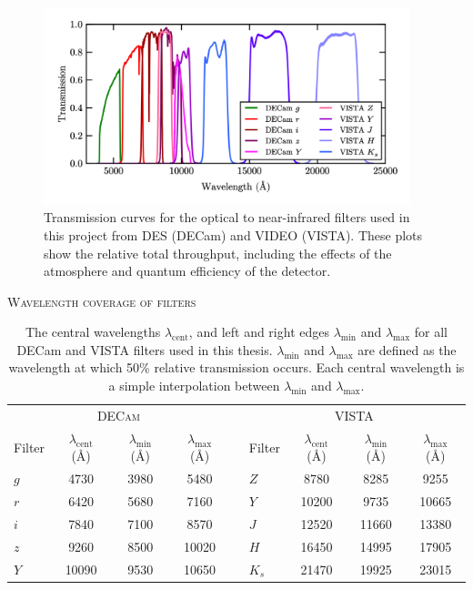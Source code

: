 \begin{figure}[!pht] 
\centering    
\includegraphics[width=0.95\textwidth]{filters.png}
\caption[DES and VIDEO filter transmission curves]{Transmission curves for the optical to near-infrared filters used in this project from DES (DECam) and VIDEO (VISTA). These plots show the relative total throughput, including the effects of the atmosphere and quantum efficiency of the detector.}
\label{fig:filters}
\end{figure}

\begin{table}[!phb]
\centering
\textsc{Wavelength coverage of filters} \\
\vspace{0.1em}
\footnotesize
\begin{tabular}{lcccclccc}
\toprule\toprule
\multicolumn{4}{c}{\textsc{DECam}} & &  \multicolumn{4}{c}{VISTA}  \\
Filter & $\lambda_{\mathrm{cent}}$ (\si{\angstrom}) & $\lambda_{\mathrm{min}}$ (\si{\angstrom}) & $\lambda_{\mathrm{max}}$ (\si{\angstrom}) & & Filter & $\lambda_{\mathrm{cent}}$ (\si{\angstrom}) & $\lambda_{\mathrm{min}}$ (\si{\angstrom})  & $\lambda_{\mathrm{max}}$ (\si{\angstrom}) \\
\midrule
$g$ & 4730 & 3980 & 5480 & & $Z$ & 8780 & 8285 & 9255 \\ 
$r$ & 6420 & 5680 & 7160 & & $Y$ & 10200 & 9735 & 10665 \\
$i$ & 7840 & 7100 & 8570 & & $J$ & 12520 & 11660 & 13380 \\
$z$ & 9260 & 8500 & 10020 & & $H$ & 16450 & 14995 & 17905 \\
$Y$ & 10090 & 9530 & 10650 & & $K_{s}$ & 21470 & 19925 & 23015 \\
\bottomrule
\end{tabular}
\vspace{1em}
\caption[Wavelength coverage of broadband filters]{The central wavelengths $\lambda_{\mathrm{cent}}$, and left and right edges $\lambda_{\mathrm{min}}$ and $\lambda_{\mathrm{max}}$ for all DECam and VISTA filters used in this thesis. $\lambda_{\mathrm{min}}$ and $\lambda_{\mathrm{max}}$ are defined as the wavelength at which 50\% relative transmission occurs. Each central wavelength is a simple interpolation between $\lambda_{\mathrm{min}}$ and $\lambda_{\mathrm{max}}$.}
\label{table:effective_wavelengths}
\end{table} 




